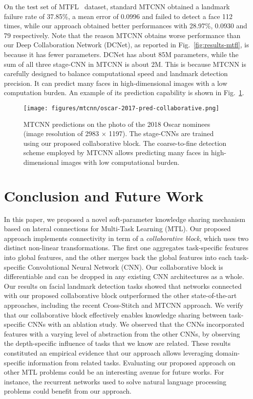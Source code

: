 \documentclass[runningheads]{llncs}
\newcommand{\citep}{\cite}
\begin{document}
On the test set of MTFL~\citep{zhang2014facial} dataset, standard MTCNN obtained a landmark failure rate of 37.85\%, a mean error of 0.0996 and failed to detect a face 112 times, while our approach obtained better performances with 28.97\%, 0.0930 and 79 respectively. Note that the reason MTCNN obtains worse performance than our Deep Collaboration Network (DCNet), as reported in Fig.~\ref{fig:results-mtfl}, is because it has fewer parameters. DCNet has about 85M parameters, while the sum of all three stage-CNN in MTCNN is about 2M. This is because MTCNN is carefully designed to balance computational speed and landmark detection precision. It can predict many faces in high-dimensional images with a low computation burden. An example of its prediction capability is shown in Fig.~\ref{fig:oscar-2017predcollaborative}.


\begin{figure}[t]
    \centering
    \texttt{[image: figures/mtcnn/oscar-2017-pred-collaborative.png]}
    \caption{MTCNN predictions on the photo of the 2018 Oscar nominees (image resolution of 2983 $\times$ 1197). The stage-CNNs are trained using our proposed collaborative block. The coarse-to-fine detection scheme employed by MTCNN allows predicting many faces in high-dimensional images with low computational burden.}
    \label{fig:oscar-2017predcollaborative}
\end{figure}



\section{Conclusion and Future Work}
\label{sec:conclusion}
In this paper, we proposed a novel soft-parameter knowledge sharing mechanism based on lateral connections for Multi-Task Learning (MTL). Our proposed approach implements connectivity in term of a \textit{collaborative block}, which uses two distinct non-linear transformations. The first one aggregates task-specific features into global features, and the other merges back the global features into each task-specific Convolutional Neural Network (CNN). Our collaborative block is differentiable and can be dropped in any existing CNN architectures as a whole.
Our results on facial landmark detection tasks showed that networks connected with our proposed collaborative block outperformed the other state-of-the-art approaches, including the recent Cross-Stitch and MTCNN approach. We verify that our collaborative block effectively enables knowledge sharing between task-specific CNNs with an ablation study. We observed that the CNNs incorporated features with a varying level of abstraction from the other CNNs, by observing the depth-specific influence of tasks that we know are related. These results constituted an empirical evidence that our approach allows leveraging domain-specific information from related tasks. 
Evaluating our proposed approach on other MTL problems could be an interesting avenue for future works. For instance, the recurrent networks used to solve natural language processing problems could benefit from our approach.
\end{document}
